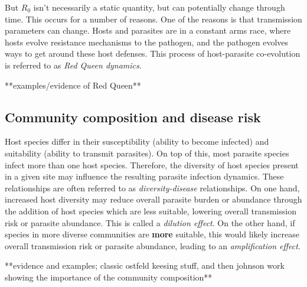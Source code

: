 \documentclass[12pt]{article}
\begin{document}
But $R_0$ isn't necessarily a static quantity, but can potentially change through time. This occurs for a number of reasons. One of the reasons is that transmission parameters can change. Hosts and parasites are in a constant arms race, where hosts evolve resistance mechanisms to the pathogen, and the pathogen evolves ways to get around these host defenses. This process of host-parasite co-evolution is referred to as \textit{Red Queen dynamics}.

**examples/evidence of Red Queen**











\bigskip
\subsection*{Community composition and disease risk}

Host species differ in their susceptibility (ability to become infected) and suitability (ability to transmit parasites). On top of this, most parasite species infect more than one host species. Therefore, the diversity of host species present in a given site may influence the resulting parasite infection dynamics. These relationships are often referred to as \textit{diversity-disease} relationships. On one hand, increased host diversity may reduce overall parasite burden or abundance through the addition of host species which are less suitable, lowering overall transmission risk or parasite abundance. This is called a \textit{dilution effect}. On the other hand, if species in more diverse communities are \textbf{more} suitable, this would likely increase overall transmission risk or parasite abundance, leading to an \textit{amplification effect}. 


**evidence and examples; classic ostfeld keesing stuff, and then johnson work showing the importance of the community composition**
\end{document}
